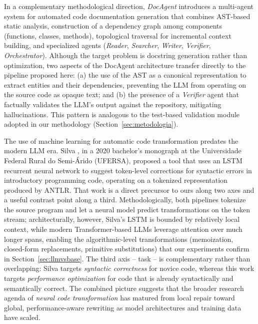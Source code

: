 \documentclass[conference]{IEEEtran}
\begin{document}
In a complementary methodological direction, \textit{DocAgent} \cite{DBLP:journals/corr/abs-2504-08725} introduces a multi-agent system for automated code documentation generation that combines AST-based static analysis, construction of a dependency graph among components (functions, classes, methods), topological traversal for incremental context building, and specialized agents (\textit{Reader}, \textit{Searcher}, \textit{Writer}, \textit{Verifier}, \textit{Orchestrator}). Although the target problem is docstring generation rather than optimization, two aspects of the DocAgent architecture transfer directly to the pipeline proposed here: (a) the use of the AST as a canonical representation to extract entities and their dependencies, preventing the LLM from operating on the source code as opaque text; and (b) the presence of a \textit{Verifier} agent that factually validates the LLM's output against the repository, mitigating hallucinations. This pattern is analogous to the test-based validation module adopted in our methodology (Section~\ref{sec:metodologia}).

The use of machine learning for automatic code transformation predates the modern LLM era. Silva \cite{silva2020ferramenta}, in a 2020 bachelor's monograph at the Universidade Federal Rural do Semi-{\'A}rido (UFERSA), proposed a tool that uses an LSTM recurrent neural network to suggest token-level corrections for syntactic errors in introductory programming code, operating on a tokenized representation produced by ANTLR. That work is a direct precursor to ours along two axes and a useful contrast point along a third. Methodologically, both pipelines tokenize the source program and let a neural model predict transformations on the token stream; architecturally, however, Silva's LSTM is bounded by relatively local context, while modern Transformer-based LLMs leverage attention over much longer spans, enabling the algorithmic-level transformations (memoization, closed-form replacements, primitive substitutions) that our experiments confirm in Section~\ref{sec:llmvsbase}. The third axis -- task -- is complementary rather than overlapping: Silva targets \emph{syntactic correctness} for novice code, whereas this work targets \emph{performance optimization} for code that is already syntactically and semantically correct. The combined picture suggests that the broader research agenda of \textit{neural code transformation} has matured from local repair toward global, performance-aware rewriting as model architectures and training data have scaled.
\end{document}
